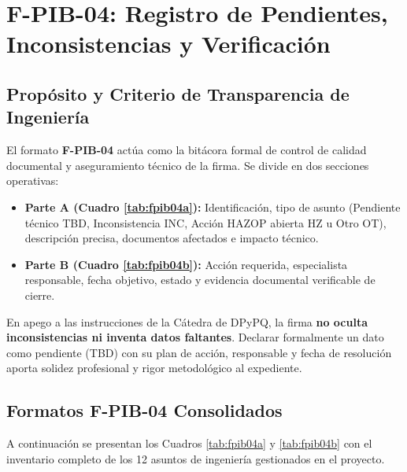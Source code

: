 \documentclass[10pt,letterpaper]{article}
\begin{document}
\section{F-PIB-04: Registro de Pendientes, Inconsistencias y Verificación}

\subsection{Propósito y Criterio de Transparencia de Ingeniería}
El formato \textbf{F-PIB-04} actúa como la bitácora formal de control de calidad documental y aseguramiento técnico de la firma. Se divide en dos secciones operativas:
\begin{itemize}
    \item \textbf{Parte A (Cuadro \ref{tab:fpib04a}):} Identificación, tipo de asunto (Pendiente técnico TBD, Inconsistencia INC, Acción HAZOP abierta HZ u Otro OT), descripción precisa, documentos afectados e impacto técnico.
    \item \textbf{Parte B (Cuadro \ref{tab:fpib04b}):} Acción requerida, especialista responsable, fecha objetivo, estado y evidencia documental verificable de cierre.
\end{itemize}

\begin{tcolorbox}[colframe=darkred,colback=boxbg,arc=2mm,boxrule=1pt,title=\textbf{Principio Rector contra el Ocultamiento de Información}]
\small
En apego a las instrucciones de la Cátedra de DPyPQ, la firma \textbf{no oculta inconsistencias ni inventa datos faltantes}. Declarar formalmente un dato como pendiente (TBD) con su plan de acción, responsable y fecha de resolución aporta solidez profesional y rigor metodológico al expediente.
\end{tcolorbox}

\subsection{Formatos F-PIB-04 Consolidados}
A continuación se presentan los Cuadros \ref{tab:fpib04a} y \ref{tab:fpib04b} con el inventario completo de los 12 asuntos de ingeniería gestionados en el proyecto.
\end{document}
